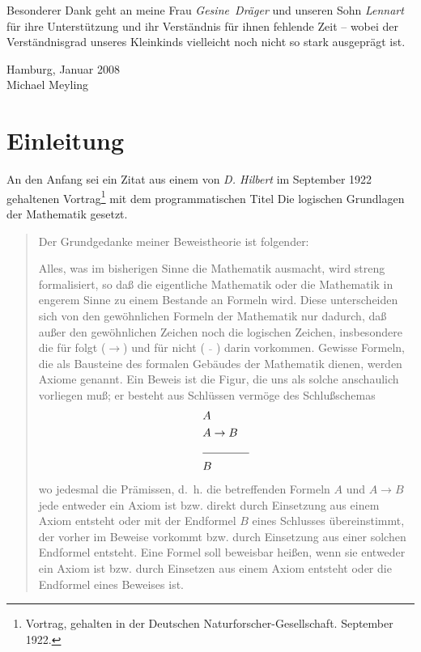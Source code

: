 \documentclass[a4paper,german,10pt,twoside]{book}
\theoremstyle{definition}
\theoremstyle{remark}
\begin{document}
\par
Besonderer Dank geht an meine Frau \emph{Gesine~Dr{\"a}ger} und unseren Sohn \emph{Lennart} f{\"u}r ihre Unterst{\"u}tzung und ihr Verst{\"a}ndnis f{\"u}r ihnen fehlende Zeit -- wobei der Verst{\"a}ndnisgrad unseres Kleinkinds vielleicht noch nicht so stark ausgepr{\"a}gt ist.

\par
\vspace*{1cm} Hamburg, Januar 2008 \\
\hspace*{\fill} Michael Meyling


\chapter*{Einleitung} \label{chapter2} \hypertarget{chapter2}{}

An den Anfang sei ein Zitat aus einem von \emph{D. Hilbert} im September 1922 gehaltenen Vortrag\footnote{Vortrag, gehalten in der Deutschen Naturforscher-Gesellschaft. September 1922.} mit dem programmatischen Titel {\glqq Die logischen Grundlagen der Mathematik\grqq} gesetzt.

\par
\begin{quote} {
\glqq Der Grundgedanke meiner Beweistheorie ist folgender:
\par
Alles, was im bisherigen Sinne die Mathematik ausmacht, wird streng formalisiert, so da{\ss} die eigentliche Mathematik oder die Mathematik in engerem Sinne zu einem Bestande an Formeln wird. Diese unterscheiden sich von den gew{\"o}hnlichen Formeln der Mathematik nur dadurch, da{\ss} au{\ss}er den gew{\"o}hnlichen Zeichen noch die logischen Zeichen, insbesondere die f{\"u}r {\glqq folgt\grqq} ($\rightarrow$) und f{\"u}r {\glqq nicht\grqq} ($\bar{\quad}$) darin vorkommen. Gewisse Formeln, die als Bausteine des formalen Geb{\"a}udes der Mathematik dienen, werden Axiome genannt. Ein Beweis ist die Figur, die uns als solche anschaulich vorliegen mu{\ss}; er besteht aus Schl{\"u}ssen verm{\"o}ge des Schlu{\ss}schemas\\
\begin{eqnarray*}
& A & \\
& A \rightarrow B& \\
\cline{2-3}
 & B &
\end{eqnarray*}
wo jedesmal die Pr{\"a}missen, d.~h. die betreffenden Formeln $A$ und $A \rightarrow B$ jede entweder ein Axiom ist bzw. direkt durch Einsetzung aus einem Axiom entsteht oder mit der Endformel $B$ eines Schlusses {\"u}bereinstimmt, der vorher im Beweise vorkommt bzw. durch Einsetzung aus einer solchen Endformel entsteht. Eine Formel soll beweisbar hei{\ss}en, wenn sie entweder ein Axiom ist bzw. durch Einsetzen aus einem Axiom entsteht oder die Endformel eines Beweises ist.\grqq}
\end{quote}
\end{document}
